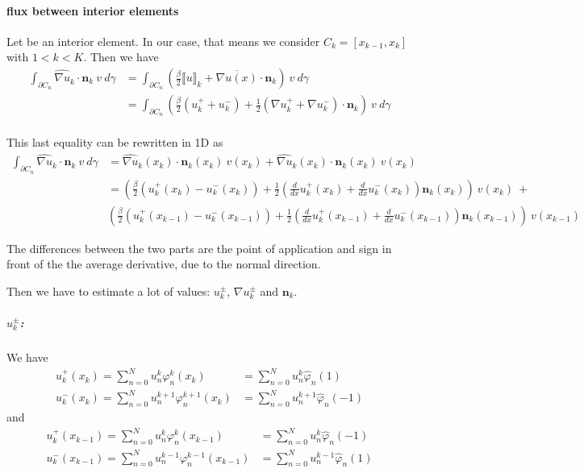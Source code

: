 \documentclass[a4paper,10pt,draft]{article}
\begin{document}
\paragraph{flux between interior elements}

Let be an interior element. In our case, that means we consider $C_k = [x_{k-1},x_k]$ with $1<k<K$. 
Then we have
\begin{align*}
 \int_{\partial C_n} \widehat{\nabla u}_k \cdot \mathbf{n}_k\ v\ d\gamma &= \int_{\partial C_n} 
\left(\frac{\beta}{2} \llbracket u \rrbracket_k + \overline{\nabla u(x)} \cdot \mathbf{n}_k 
\right)\ v\ d\gamma \\
&= \int_{\partial C_n} \left(\frac{\beta}{2} (u^+_k + u^-_k) + \frac{1}{2} (\nabla u^+_k + \nabla 
u^-_k) \cdot \mathbf{n}_k \right)\ v\ d\gamma \\
\end{align*}

This last equality can be rewritten in 1D as
\begin{align*}
 \int_{\partial C_n} \widehat{\nabla u}_k \cdot \mathbf{n}_k\ v\ d\gamma &= \widehat{\nabla 
u}_k(x_k) \cdot \mathbf{n}_k(x_k)\ v(x_k) + \widehat{\nabla u}_k(x_k) \cdot \mathbf{n}_k(x_k)\ 
v(x_k)\\
 &=\left(\frac{\beta}{2} (u^+_k(x_k) - u^-_k(x_k)) + \frac{1}{2} \left(\frac{d}{dx} u^+_k(x_k) + 
\frac{d}{dx} u^-_k(x_k)\right) \mathbf{n}_k(x_k) \right)\ v(x_k) \ + \\
& \left(\frac{\beta}{2} (u^+_k(x_{k-1}) - u^-_k(x_{k-1})) + \frac{1}{2} \left(\frac{d}{dx} 
u^+_k(x_{k-1}) + \frac{d}{dx} u^-_k(x_{k-1})\right)\mathbf{n}_k(x_{k-1}) \right)\ v(x_{k-1})
\end{align*}

The differences between the two parts are the point of application and sign in front of the the 
average derivative, due to the normal direction.

Then we have to estimate a lot of values: $u^\pm_k$, $\nabla u^\pm_k$ and $\mathbf{n}_k$.

\subparagraph{$u^\pm_k$:}
We have
\begin{align*}
 u^+_k(x_k) = \sum_{n=0}^N u_n^k \varphi_n^k(x_k) &= \sum_{n=0}^N u_n^k \hat \varphi_n(1) \\
 u^-_k(x_k) = \sum_{n=0}^N u_n^{k+1} \varphi_n^{k+1}(x_k) &= \sum_{n=0}^N u_n^{k+1} \hat 
\varphi_n(-1)
\end{align*}
and
\begin{align*}
 u^+_k(x_{k-1}) = \sum_{n=0}^N u_n^k \varphi_n^k(x_{k-1}) &= \sum_{n=0}^N u_n^k \hat \varphi_n(-1) 
\\
 u^-_k(x_{k-1}) = \sum_{n=0}^N u_n^{k-1} \varphi_n^{k-1}(x_{k-1}) &= \sum_{n=0}^N u_n^{k-1} \hat 
\varphi_n(1)
\end{align*}
\end{document}
